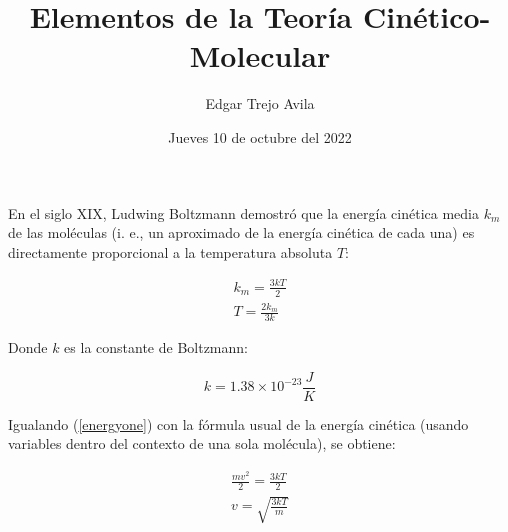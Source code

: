 \documentclass{article}
\title{Elementos de la Teoría Cinético-Molecular}
\author{Edgar Trejo Avila}
\date{Jueves 10 de octubre del 2022}
\begin{document}
\maketitle

En el siglo XIX, Ludwing Boltzmann demostró que la energía
cinética media \(k_m\) de las moléculas (i. e., un aproximado
de la energía cinética de cada una) es directamente 
proporcional a la temperatura absoluta \(T\):

\begin{align}
    k_m = \frac{3kT}{2} \label{energyone} \\
    T = \frac{2k_m}{3k} \nonumber
\end{align}

Donde \(k\) es la constante de Boltzmann:

\[
    k = 1.38\times10^{-23} \frac{J}{K}
\]

Igualando (\ref{energyone}) con la fórmula usual
de la energía cinética (usando variables dentro 
del contexto de una sola molécula), se obtiene:

\begin{align}
    \frac{mv^2}{2} = \frac{3kT}{2} \nonumber \\
    v = \sqrt{\frac{3kT}{m}}
\end{align}
\end{document}
